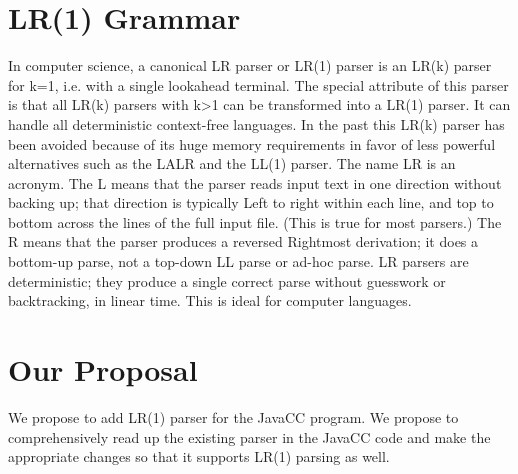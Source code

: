 \documentclass{article}
\begin{document}
  
\section{LR(1) Grammar}
In computer science, a canonical LR parser or LR(1) parser is an LR(k) parser for k=1, i.e. with a single lookahead terminal. The special attribute of this parser is that all LR(k) parsers with k>1 can be transformed into a LR(1) parser. It can handle all deterministic context-free languages. In the past this LR(k) parser has been avoided because of its huge memory requirements in favor of less powerful alternatives such as the LALR and the LL(1) parser. The name LR is an acronym. The L means that the parser reads input text in one direction without backing up; that direction is typically Left to right within each line, and top to bottom across the lines of the full input file. (This is true for most parsers.) The R means that the parser produces a reversed Rightmost derivation; it does a bottom-up parse, not a top-down LL parse or ad-hoc parse. LR parsers are deterministic; they produce a single correct parse without guesswork or backtracking, in linear time. This is ideal for computer languages.

\section{Our Proposal}
We propose to add LR(1) parser for the JavaCC program. We propose to comprehensively read up the existing parser in the JavaCC code and make the appropriate changes so that it supports LR(1) parsing as well.
\end{document}
